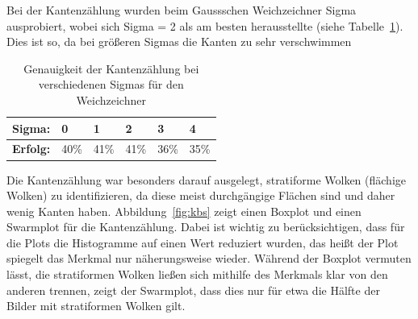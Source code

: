 \documentclass[a4,german]{article}
\begin{document}
Bei der Kantenzählung wurden beim Gaussschen Weichzeichner Sigma ausprobiert, wobei sich Sigma = 2 als am besten herausstellte (siehe Tabelle~\ref{tab:sigma}). Dies ist so, da bei größeren Sigmas die Kanten zu sehr verschwimmen %
\begin{table}[h]
\begin{tabular}{|l|l|l|l|l|l|}
 \hline
 \textbf{Sigma:} & 0 & 1 & 2 & 3 & 4\\
 \hline
 \textbf{Erfolg:} & 40\% & 41\% & 41\% & 36\% & 35\% \\
 \hline
\end{tabular}
\caption{Genauigkeit der Kantenzählung bei verschiedenen Sigmas für den Weichzeichner}
\label{tab:sigma}
\end{table}
Die Kantenzählung war besonders darauf ausgelegt, stratiforme Wolken (flächige Wolken) zu identifizieren, da diese meist durchgängige Flächen sind und daher wenig Kanten haben. Abbildung~\ref{fig:kbs} zeigt einen Boxplot und einen Swarmplot für die Kantenzählung. Dabei ist wichtig zu berücksichtigen, dass für die Plots die Histogramme auf einen Wert reduziert wurden, das heißt der Plot spiegelt das Merkmal nur näherungsweise wieder. Während der Boxplot vermuten lässt, die stratiformen Wolken ließen sich mithilfe des Merkmals klar von den anderen trennen, zeigt der Swarmplot, dass dies nur für etwa die Hälfte der Bilder mit stratiformen Wolken gilt. %
\end{document}
